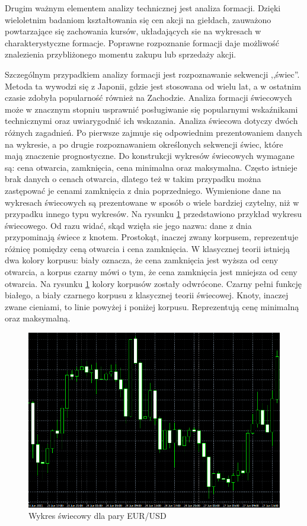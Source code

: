 \documentclass[pdflatex,11pt]{aghdpl}
\begin{document}
Drugim ważnym elementem analizy technicznej jest analiza formacji. Dzięki wieloletnim badaniom kształtowania się cen akcji na giełdach, zauważono powtarzające się zachowania kursów, układających sie na wykresach w charakterystyczne formacje. Poprawne rozpoznanie formacji daje możliwość znalezienia przybliżonego momentu zakupu lub sprzedaży akcji. 

Szczególnym przypadkiem analizy formacji jest rozpoznawanie sekwencji ,,świec''. Metoda ta wywodzi się z Japonii, gdzie jest stosowana od wielu lat, a w ostatnim czasie zdobyła popularność również na Zachodzie. Analiza formacji świecowych może w znacznym stopniu usprawnić posługiwanie się popularnymi wskaźnikami technicznymi oraz uwiarygodnić ich wskazania\cite{3}. Analiza świecowa dotyczy dwóch różnych zagadnień. Po pierwsze zajmuje się odpowiednim prezentowaniem danych na wykresie, a po drugie rozpoznawaniem określonych sekwencji świec, które mają znaczenie prognostyczne. Do konstrukcji wykresów świecowych wymagane są: cena otwarcia, zamknięcia, cena minimalna oraz maksymalna. Często istnieje brak danych o cenach otwarcia, dlatego też w takim przypadku można zastępować je cenami zamknięcia z dnia poprzedniego. Wymienione dane na wykresach świecowych są prezentowane w sposób o wiele bardziej czytelny, niż w przypadku innego typu wykresów. Na rysunku \ref{swieca} przedstawiono przykład wykresu świecowego. Od razu widać, skąd wzięła sie jego nazwa: dane z dnia przypominają świece z knotem. Prostokąt, inaczej zwany korpusem, reprezentuje różnicę pomiędzy ceną otwarcia i cena zamknięcia. W klasycznej teorii istnieją dwa kolory korpusu: biały oznacza, że cena zamknięcia jest wyższa od ceny otwarcia, a korpus czarny mówi o tym, że cena zamknięcia jest mniejsza od ceny otwarcia. Na rysunku \ref{swieca} kolory korpusów zostały odwrócone. Czarny pełni funkcję białego, a biały czarnego korpusu z klasycznej teorii świecowej. Knoty, inaczej zwane cieniami, to linie powyżej i poniżej korpusu. Reprezentują cenę minimalną oraz maksymalną. 
\begin{figure}[ht]
\begin{center}
\includegraphics[width=15cm]{candles.png}
\caption{Wykres świecowy dla pary EUR/USD}
\label{swieca}
\end{center}
\end{figure} 
\end{document}

